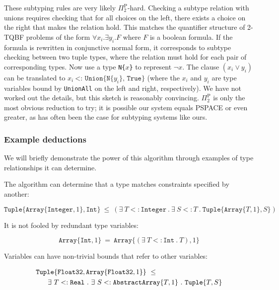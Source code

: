 
These subtyping rules are very likely $\Pi_2^{\textrm{P}}$-hard.
Checking a subtype relation with unions requires checking that for all choices
on the left, there exists a choice on the right that makes the relation hold.
This matches the quantifier structure of 2-TQBF problems of the form
$\forall x_i . \exists y_i . F$ where $F$ is a boolean formula. If the formula
is rewritten in conjunctive normal form, it corresponds to subtype checking
between two tuple types, where the relation must hold for each pair of
corresponding types. Now use a type \texttt{N\{}$x$\texttt{\}} to
represent $\neg x$. The clause $(x_i \vee y_i)$ can be translated to
$x_i\ \texttt{<:\ Union\{N\{}y_i\texttt{\}, True\}}$ (where the $x_i$ and
$y_i$ are type variables bound by \texttt{UnionAll} on the left and right,
respectively).
We have not worked out the details, but this sketch is reasonably
convincing. $\Pi_2^{\textrm{P}}$ is only the most obvious
reduction to try; it is possible our system equals PSPACE or even greater,
as has often been the case for subtyping systems like ours.

\subsubsection{Example deductions}

We will briefly demonstrate the power of this algorithm through examples of
type relationships it can determine.

\noindent
The algorithm can determine that a type matches constraints specified by another:

\vspace{-5ex}
\[
\texttt{Tuple}\{\texttt{Array}\{\texttt{Integer},1\}, \texttt{Int}\}\ \leq\ 
  (\exists\ T<:\texttt{Integer}\ .\ \exists\ S<:T\ .\ \texttt{Tuple}\{\texttt{Array}\{T,1\},S\})
\]

\vspace{-1ex}
\noindent
It is not fooled by redundant type variables:

\vspace{-2ex}
\[
\texttt{Array}\{\texttt{Int},1\}\ =\ 
  \texttt{Array}\{(\exists\ T<:\texttt{Int}\ .\ T), 1\} \]

\noindent
Variables can have non-trivial bounds that refer to other variables:

\vspace{-3ex}
\begin{singlespace}
\begin{align*}
&\texttt{Tuple}\{\texttt{Float32},\texttt{Array}\{\texttt{Float32},1\}\}\ \leq\ \\
&\hspace{4ex}\exists\ T<:\texttt{Real}\ .\ \exists\ S<:\texttt{AbstractArray}\{T,1\}\ .\ \texttt{Tuple}\{T,S\}
\end{align*}
\end{singlespace}

